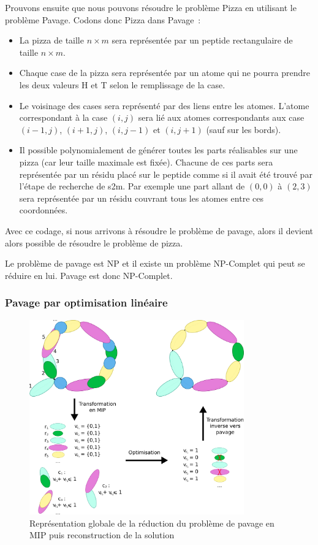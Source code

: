 Prouvons ensuite que nous pouvons résoudre le problème Pizza en utilisant le problème Pavage.
Codons donc Pizza dans Pavage~:
\begin{itemize}
	\item La pizza de taille $n \times m$ sera représentée par un peptide rectangulaire de taille $n \times m$.
	\item Chaque case de la pizza sera représentée par un atome qui ne pourra prendre les deux valeurs H et T selon le remplissage de la case.
	\item Le voisinage des cases sera représenté par des liens entre les atomes.
	L'atome correspondant à la case $(i,j)$ sera lié aux atomes correspondants aux case $(i-1,j)$, $(i+1,j)$, $(i,j-1)$ et $(i,j+1)$ (sauf sur les bords).
	\item Il possible polynomialement de générer toutes les parts réalisables sur une pizza (car leur taille maximale est fixée).
	Chacune de ces parts sera représentée par un résidu placé sur le peptide comme si il avait été trouvé par l'étape de recherche de s2m.
	Par exemple une part allant de $(0,0)$ à $(2,3)$ sera représentée par un résidu couvrant tous les atomes entre ces coordonnées.
\end{itemize}

Avec ce codage, si nous arrivons à résoudre le problème de pavage, alors il devient alors possible de résoudre le problème de pizza.

Le problème de pavage est NP et il existe un problème NP-Complet qui peut se réduire en lui.
Pavage est donc NP-Complet.




\subsubsection{Pavage par optimisation linéaire}

\label{MIP_p}

\begin{figure}[!ht]
  \begin{center}
    \includegraphics[width=350px]{Figures/s2m/pavage/MIP.png}
    \caption{\label{reduction}Représentation globale de la réduction du problème de pavage en MIP puis reconstruction de la
    solution}
  \end{center}
\end{figure}

